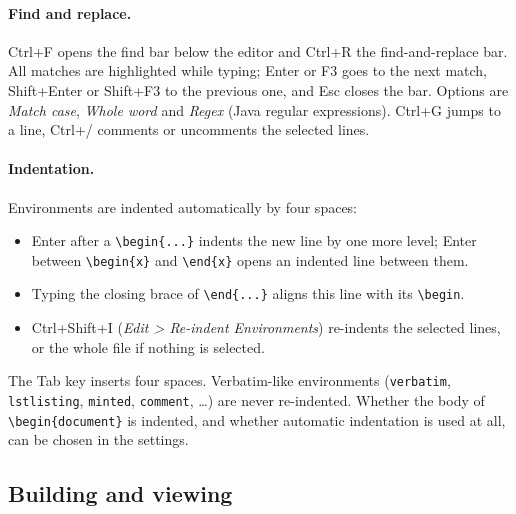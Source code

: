 \documentclass[11pt]{article}
\newcommand{\key}[1]{\textsf{#1}}
\newcommand{\menu}[1]{\textsf{\textit{#1}}}
\begin{document}
    \paragraph{Find and replace.} \key{Ctrl+F} opens the find bar below the editor and \key{Ctrl+R} the find-and-replace bar. All matches are highlighted while typing; \key{Enter} or \key{F3} goes to the next match, \key{Shift+Enter} or \key{Shift+F3} to the previous one, and \key{Esc} closes the bar. Options are \emph{Match case}, \emph{Whole word} and \emph{Regex} (Java regular expressions). \key{Ctrl+G} jumps to a line, \key{Ctrl+/} comments or uncomments the selected lines.

    \paragraph{Indentation.} Environments are indented automatically by four spaces:
    \begin{itemize}
        \itemsep-1mm
        \item \key{Enter} after a \verb+\begin{...}+ indents the new line by one more level; \key{Enter} between \verb+\begin{x}+ and \verb+\end{x}+ opens an indented line between them.
        \item Typing the closing brace of \verb+\end{...}+ aligns this line with its \verb+\begin+.
        \item \key{Ctrl+Shift+I} (\menu{Edit > Re-indent Environments}) re-indents the selected lines, or the whole file if nothing is selected.
    \end{itemize}
    The \key{Tab} key inserts four spaces. Verbatim-like environments (\verb+verbatim+, \verb+lstlisting+, \verb+minted+, \verb+comment+, \ldots) are never re-indented. Whether the body of \verb+\begin{document}+ is indented, and whether automatic indentation is used at all, can be chosen in the settings.

    \subsection{Building and viewing}
\end{document}
